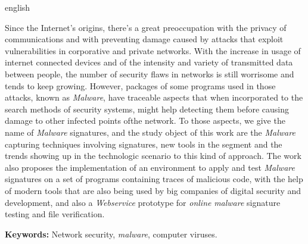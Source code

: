 \documentclass[
	12pt,				%
	openright,			%
	oneside,			%
	a4paper,			%
	english,			%
	french,				%
	spanish,			%
	brazil				%
	]{abntex2}
\begin{document}
\begin{resumo}[Abstract]
\begin{otherlanguage*}{english}

Since the Internet's origins, there's a great preoccupation with the privacy of communications and with preventing damage caused by attacks that exploit vulnerabilities in corporative and private networks. With the increase in usage of internet connected devices and of the intensity and variety of transmitted data between people, the number of security flaws in networks is still worrisome and tends to keep growing. However, packages of some programs used in those attacks, known as \textit{Malware}, have traceable aspects that when incorporated to the search methods of security systems, might help detecting them before causing damage to other infected points ofthe network. To those aspects, we give the name of \textit{Malware} signatures, and the study object of this work are the \textit{Malware} capturing techniques involving signatures, new tools in the segment and the trends showing up in the technologic scenario to this kind of approach. The work also proposes the implementation of an environment to apply and test \textit{Malware} signatures on a set of programs containing traces of malicious code, with the help of modern tools that are also being used by big companies of digital security and development, and also a \textit{Webservice} prototype for \textit{online} \textit{malware} signature testing and file verification.

\textbf{Keywords:} Network security, \textit{malware}, computer viruses.

 \end{otherlanguage*}
\end{resumo}

\listoffigures*
\cleardoublepage

\listoftables*
\cleardoublepage



\tableofcontents*
\cleardoublepage



\pagestyle{simple}
\end{document}
